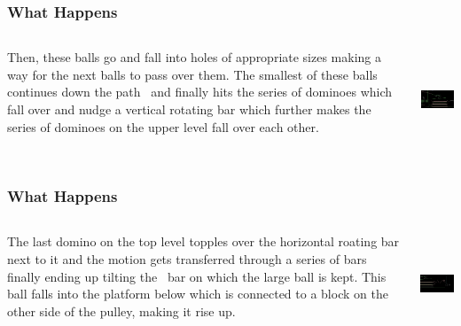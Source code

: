 \begin{frame}
\frametitle{What Happens}
\begin{columns}
\begin{column}{.7\textwidth}
\begin{scriptsize}
Then, these balls go and fall into holes of appropriate sizes making a way for the next balls to pass over them. The smallest of these balls continues down the path \
and finally hits the series of dominoes which fall over and nudge a vertical rotating bar which further makes the series of dominoes on the upper level fall over each other.\
\end{scriptsize}
\end{column}
\begin{column}{.4\textwidth}
\includegraphics[width=4.5cm,height=3cm]{wh2}
\end{column}
\end{columns}
\end{frame}


\begin{frame}
\frametitle{What Happens}
\begin{columns}
\begin{column}{.7\textwidth}
\begin{scriptsize}
The last domino on the top level topples over the horizontal roating bar next to it and the motion gets transferred through a series of bars finally ending up tilting the \
bar on which the large ball is kept. This ball falls into the platform below which is connected to a block on the other side of the pulley, making it rise up.
\end{scriptsize}
\end{column}
\pause
\begin{column}{.4\textwidth}
\includegraphics[width=4.5cm,height=3cm]{wh3}
\end{column}
\end{columns}
\end{frame}

